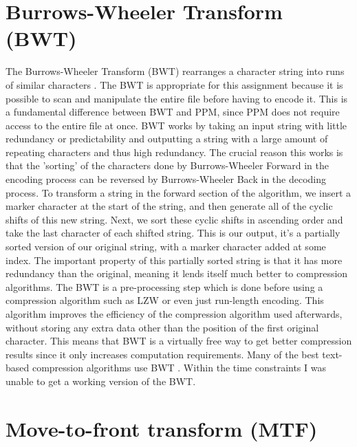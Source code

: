 \documentclass[a4paper, 11pt]{article}
\numberwithin{equation}{section}
\theoremstyle{plain}
\theoremstyle{definition}
\begin{document}
\section{Burrows-Wheeler Transform (BWT)}
The Burrows-Wheeler Transform (BWT) rearranges a character string into runs of similar characters \cite{burrows1994block}. 
The BWT is appropriate for this assignment because it is possible to scan and manipulate the entire file 
before having to encode it. 
This is a fundamental difference between BWT and PPM, since PPM does not require access to the entire file 
at once. 
BWT works by taking an input string with little redundancy or predictability and outputting a string with 
a large amount of repeating characters and thus high redundancy. 
The crucial reason this works is that the 'sorting' of the characters done by Burrows-Wheeler Forward 
in the encoding process can be reversed by Burrows-Wheeler Back in the decoding process. 
To transform a string in the forward section of the algorithm, we insert a marker character at the start 
of the string, and then generate all of the cyclic shifts of this new string. 
Next, we sort these cyclic shifts in ascending order and take the last character of each shifted string. 
This is our output, it's a partially sorted version of our original string, with a marker character added 
at some index. 
The important property of this partially sorted string is that it has more redundancy than the original, 
meaning it lends itself much better to compression algorithms. 
The BWT is a pre-processing step which is done before using a compression algorithm such as LZW or 
even just run-length encoding. 
This algorithm improves the efficiency of the compression algorithm used afterwards, without storing 
any extra data other than the position of the first original character. 
This means that BWT is a virtually free way to get better compression results since it only increases 
computation requirements. 
Many of the best text-based compression algorithms use BWT \cite{TextBenchmark}. 
Within the time constraints I was unable to get a working version of the BWT. 


\section{Move-to-front transform (MTF)}
\end{document}
